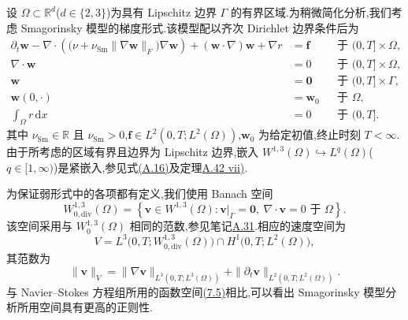 \begin{note}
\label{note:smagorinsky-strong-form}
设 $\Omega\subset\mathbb{R}^d$($d\in\{2,3\}$)为具有 Lipschitz 边界 $\Gamma$ 的有界区域.为稍微简化分析,我们考虑 Smagorinsky 模型的梯度形式.该模型配以齐次 Dirichlet 边界条件后为
\begin{equation}\label{eq:smagorinsky-strong-form}
\begin{aligned}
 \partial_t\bm{w}
  -\nabla\cdot\left(
    \bigl(\nu+\nu_{\mathrm{Sm}}\|\nabla\bm{w}\|_F\bigr)
      \nabla\bm{w}\right)
  +(\bm{w}\cdot\nabla)\bm{w}
  +\nabla r &= \bm{f}
     &&\text{于 }(0,T]\times\Omega,\\
 \nabla\cdot\bm{w}&=0
     &&\text{于 }(0,T]\times\Omega,\\
 \bm{w}&=\bm{0}
     &&\text{于 }(0,T]\times\Gamma,\\
 \bm{w}(0,\cdot)&=\bm{w}_0
     &&\text{于 }\Omega,\\
 \int_\Omega r\,\mathrm{d}x&=0
     &&\text{于 }(0,T].
\end{aligned}
\end{equation}
其中 $\nu_{\mathrm{Sm}}\in\mathbb{R}$ 且 $\nu_{\mathrm{Sm}}>0$,$\bm{f}\in L^2(0,T;L^2(\Omega))$,$\bm{w}_0$ 为给定初值,终止时刻 $T<\infty$.由于所考虑的区域有界且边界为 Lipschitz 边界,嵌入 $W^{1,3}(\Omega)\hookrightarrow L^q(\Omega)$($q\in[1,\infty)$)是紧嵌入,参见式\hyperref[eq:appendix-a-16]{(A.16)}及定理\hyperref[thm:appendix-a-42]{A.42 vii)}.
\end{note}

\begin{note}[弱形式所用的函数空间]
\label{note:smagorinsky-function-spaces}
为保证弱形式中的各项都有定义,我们使用 Banach 空间
\begin{equation}\label{eq:smagorinsky-solenoidal-space}
 W_{0,\mathrm{div}}^{1,3}(\Omega)
 =\left\{\bm{v}\in W^{1,3}(\Omega):
   \left.\bm{v}\right|_{\Gamma}=\bm{0},\
   \nabla\cdot\bm{v}=0\text{ 于 }\Omega\right\}.
\end{equation}
该空间采用与 $W_0^{1,3}(\Omega)$ 相同的范数,参见笔记\hyperref[note:appendix-a-31]{A.31}.相应的速度空间为
\begin{equation}\label{eq:smagorinsky-velocity-space}
 V=L^3\bigl(0,T;W_{0,\mathrm{div}}^{1,3}(\Omega)\bigr)
   \cap H^1\bigl(0,T;L^2(\Omega)\bigr),
\end{equation}
其范数为
\[
 \|\bm{v}\|_V
 =\|\nabla\bm{v}\|_{L^3(0,T;L^3(\Omega))}
  +\|\partial_t\bm{v}\|_{L^2(0,T;L^2(\Omega))}.
\]
与 Navier--Stokes 方程组所用的函数空间\hyperref[eq:time-dependent-ns-weak-regularity]{(7.5)}相比,可以看出 Smagorinsky 模型分析所用空间具有更高的正则性.
\end{note}

